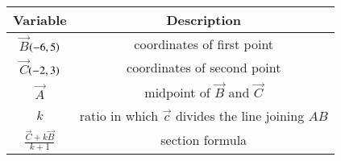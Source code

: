 \begin{tabular}[12pt]{ |c| c|}
    \hline
        \textbf{Variable}  & \textbf{Description}\\
    \hline
        $\vec{B}$$\left(-6,5\right)$ &  coordinates of first point\\
    \hline 
        $\vec{C}$$\left(-2,3\right)$ & coordinates of second point\\
    \hline
        $\vec{A}$& midpoint of $\vec{B}$ and $\vec{C}$\\ 
    \hline
        $k$ & ratio in which $\vec{c}$ divides the line joining $AB$\\
    \hline
	$\frac{\vec{C}+k\vec{B}}{k+1}$ & section formula\\
    \hline
\end{tabular}
